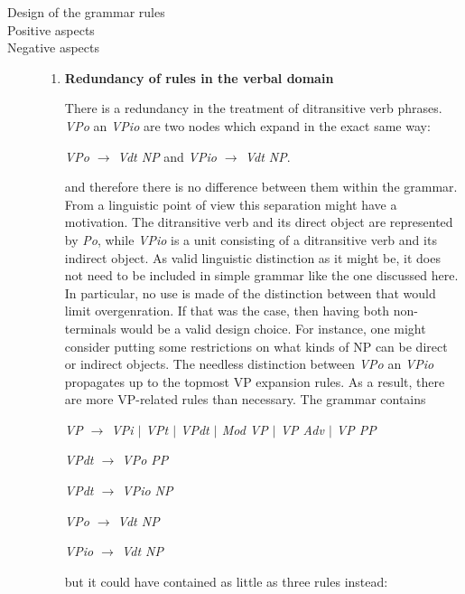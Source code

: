 \documentclass{article}
\begin{document}
\begin{description}
	\item[Design of the grammar rules]
	\item[Positive aspects]
	\item[Negative aspects]
	
	\begin{enumerate}
		\item
		\textbf{Redundancy of rules in the verbal domain}
		
		There is a redundancy in the treatment of ditransitive verb phrases. \emph{VPo} an \emph{VPio} are two nodes which expand in the exact same way:
		\begin{center}
			
			\emph{VPo $\rightarrow$ Vdt NP} and \emph{VPio $\rightarrow$ Vdt NP}.
			
		\end{center}
		and therefore there is no difference between them within the grammar. From a linguistic point of view this separation might have a motivation. The ditransitive verb and its direct object are represented by \emph{Po}, while \emph{VPio} is a unit consisting of a ditransitive verb and its indirect object. As valid linguistic distinction as it might be, it does not need to be included in simple grammar like the one discussed here. In particular, no use is made of the distinction between that would limit overgenration. If that was the case, then having both non-terminals would be a valid design choice. For instance, one might consider putting some restrictions on what kinds of NP can be direct or indirect objects.
		The needless distinction between \emph{VPo} an \emph{VPio} propagates up to the topmost VP expansion rules. As a result, there are more VP-related rules than necessary. The grammar contains
		\begin{center}
			
			\emph{VP $\rightarrow$ VPi $\vert$ VPt $\vert$ VPdt $\vert$ Mod VP $\vert$ VP Adv $\vert$ VP PP}
			
			\emph{VPdt $\rightarrow$ VPo PP}
			
			\emph{VPdt $\rightarrow$ VPio NP}
			
			\emph{VPo $\rightarrow$ Vdt NP}
			
			\emph{VPio $\rightarrow$ Vdt NP}
			
		\end{center}
		but it could have contained as little as three rules instead:
		
		\begin{center}
			

\end{center}
\end{enumerate}
\end{description}
\end{document}

